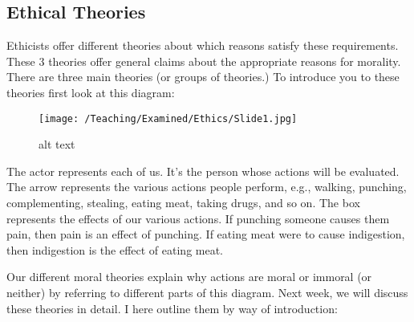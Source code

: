 \documentclass[]{article}
\begin{document}
\subsection{Ethical Theories}\label{ethical-theories}

Ethicists offer different theories about which reasons satisfy these
requirements. These 3 theories offer general claims about the
appropriate reasons for morality. There are three main theories (or
groups of theories.) To introduce you to these theories first look at
this diagram:

\begin{figure}[htbp]
\centering
\texttt{[image: /Teaching/Examined/Ethics/Slide1.jpg]}
\caption{alt text}
\end{figure}

The actor represents each of us. It's the person whose actions will be
evaluated. The arrow represents the various actions people perform,
e.g., walking, punching, complementing, stealing, eating meat, taking
drugs, and so on. The box represents the effects of our various actions.
If punching someone causes them pain, then pain is an effect of
punching. If eating meat were to cause indigestion, then indigestion is
the effect of eating meat.

Our different moral theories explain why actions are moral or immoral
(or neither) by referring to different parts of this diagram. Next week,
we will discuss these theories in detail. I here outline them by way of
introduction:
\end{document}
